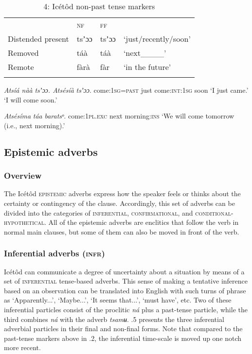 \begin{table}
\begin{table}
\caption{4: Icétôd non-past tense markers}
\label{tab:9}


\begin{tabularx}{\textwidth}{XXXX} & \textsc{nf} & \textsc{ff} & \\
\lsptoprule
Distended present & tsʼɔɔ & tsʼɔɔ & ‘just/recently/soon’\\
Removed & táà & táà & ‘next\_\_\_\_’\\
Remote & fàrà & fàr & ‘in the future’\\
\lspbottomrule
\end{tabularx}
\end{table}



\textit{Atsíá nàà     }\textit{tsʼɔɔ}\textit{.    Atsésíà     }\textit{tsʼɔɔ}.
come:\textsc{1sg=past   }just    come:\textsc{int:1sg   }soon
‘I just came.’      ‘I will come soon.’




\textit{Atsésíma     }\textit{táa}\textit{   baratsᵒ.}
come:\textsc{1pl.exc}   next   morning:\textsc{ins}
‘We will come tomorrow (i.e., next morning).’






\subsection{Epistemic adverbs}
\subsubsection{Overview}

The Icétôd \textsc{epistemic }adverbs express how the speaker feels or thinks about the certainty or contingency of the clause. Accordingly, this set of adverbs can be divided into the categories of \textsc{inferential}, \textsc{confirmational}, and \textsc{conditional-hypothetical}. All of the epistemic adverbs are enclitics that follow the verb in normal main clauses, but some of them can also be moved in front of the verb.


\subsubsection{Inferential adverbs (\textsc{infr})}

Icétôd can communicate a degree of uncertainty about a situation by means of a set of \textsc{inferential} tense-based adverbs. This sense of making a tentative inference based on an observation can be translated into English with such turns of phrase as ‘Apparently...’, ‘Maybe...’, ‘It seems that...’, ‘must have’, etc. Two of these inferential particles consist of the proclitic \textit{ná }plus a past-tense particle, while the third combines \textit{ná }with the adverb \textit{tsamʉ}. .5 presents the three inferential adverbial particles in their final and non-final forms. Note that compared to the past-tense markers above in .2, the inferential time-scale is moved up one notch more recent. 



\end{table}
